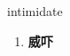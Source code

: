 
\begin{frame}
{\huge intimidate}
\begin{center}
\begin{enumerate}\Large
  \item \textbf{威吓}
\end{enumerate}
\end{center}
\end{frame}
